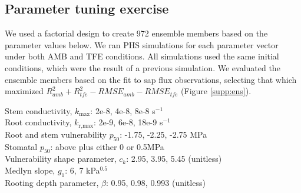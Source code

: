 \documentclass[draft,linenumbers]{agujournal}
\begin{document}
\subsection{Parameter tuning exercise}
\label{ens}

We used a factorial design to create 972 ensemble members based on the parameter values below.
We ran PHS simulations for each parameter vector under both AMB and TFE conditions.
All simulations used the same initial conditions, which were the result of a previous simulation.
We evaluated the ensemble members based on the fit to sap flux observations, selecting that which
 maximized $R^2_{amb}+R^2_{tfe}-RMSE_{amb}-RMSE_{tfe}$ (Figure \ref{supp:ens}).

Stem conductivity, $k_{\text{max}}$: 2e-8, 4e-8, 8e-8 s$^{-1}$ \\
Root conductivity, $k_{\text{r,max}}$: 2e-9, 6e-8, 18e-9 s$^{-1}$ \\
Root and stem vulnerability $p_{50}$: -1.75, -2.25, -2.75 MPa \\
Stomatal $p_{50}$: above plus either 0 or 0.5MPa \\
Vulnerability shape parameter, $c_k$: 2.95, 3.95, 5.45 (unitless) \\
Medlyn slope, $g_1$: 6, 7 kPa$^{0.5}$ \\
Rooting depth parameter, $\beta$: 0.95, 0.98, 0.993 (unitless) 




\end{document}

